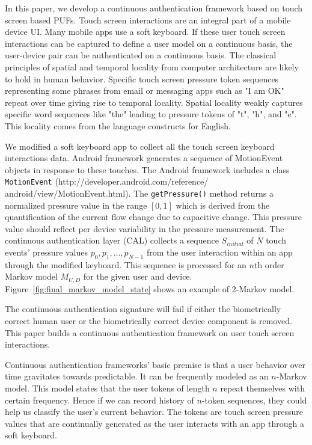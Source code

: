 \documentclass{acm_proc_article-sp}
\begin{document}
In this paper, we develop a continuous authentication framework based on touch screen based PUFs.
Touch screen interactions are an integral part of a mobile device UI. Many mobile apps use a soft keyboard. 
 If these user touch screen interactions can be captured to define a 
user model on a continuous basis, the user-device pair can be authenticated on a continuous
basis. The classical principles of spatial and temporal locality from computer architecture
are likely to hold in human behavior. Specific touch screen pressure token sequences representing
some phrases from email or messaging apps such as "I am OK" repeat over time giving rise
to temporal locality. Spatial locality weakly captures specific word sequences like "the" 
leading to pressure tokens of "t", "h", and "e". This locality comes from the language constructs for
English.

We modified a soft keyboard app to collect all the touch screen keyboard interactions data.
Android framework generates a sequence of MotionEvent objects in response to these touches.
The Android framework includes a class {\tt MotionEvent} (http://developer.android.com/reference/\\android/view/MotionEvent.html). The {\tt getPressure()} method returns a normalized pressure value in the
range $[0,1]$ which is derived from the quantification of the current flow change due to
capacitive change. This pressure value
should reflect per device variability in the pressure measurement.
The continuous authentication layer (CAL) collects a sequence $S_{initial}$ of $N$ touch events' pressure
values $p_0, p_1, \dots , p_{N-1}$ from the user interaction within an app through the modified keyboard.
This sequence is processed for an $n$th order Markov model $M_{U, D}$ for the given user and device.
Figure~\ref{fig:final_markov_model_state} shows an example of 2-Markov model.

The continuous authentication signature will fail if either the biometrically correct human user
or the biometrically correct device component is removed.
This paper builds a continuous authentication framework on user touch screen interactions.

Continuous authentication frameworks' basic premise is that a user behavior over time gravitates
towards  predictable. 
It can be frequently modeled as an $n$-Markov model. 
This model states that the user tokens of length $n$ repeat themselves with certain frequency. Hence if we can record history
of $n$-token sequences, they could help us classify the user's current behavior.
The tokens are touch screen pressure values that are continually generated
as the user interacts with an app through a soft keyboard.
\end{document}
